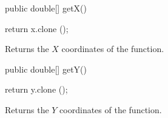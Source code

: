 \begin{code}

   public double[] getX()\begin{hide} {
      return x.clone ();
   }\end{hide}
\end{code}
\begin{tabb}   Returns the $X$ coordinates of the function.
\end{tabb}
\begin{htmlonly}
\end{htmlonly}
\begin{code}

   public double[] getY()\begin{hide} {
      return y.clone ();
   }\end{hide}
\end{code}
\begin{tabb}   Returns the $Y$ coordinates of
 the function.
\end{tabb}
\begin{htmlonly}
\end{htmlonly}
\begin{code}\begin{hide}

   public double evaluate (double x) {
      final int idx = Arrays.binarySearch (this.x, x);
      if (idx >= 0)
         return y[idx];
      final int insertionPoint = -(idx + 1);
      return y[insertionPoint];
   }
}\end{hide}
\end{code}
